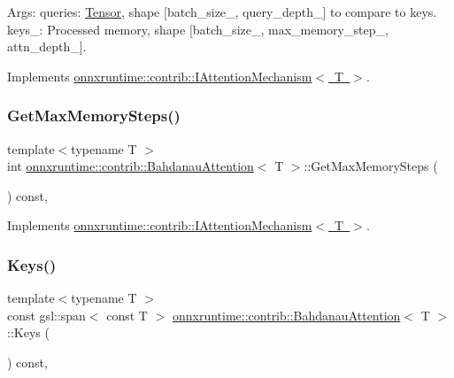 Args\+: queries\+: \mbox{\hyperlink{classonnxruntime_1_1Tensor}{Tensor}}, shape {\ttfamily \mbox{[}batch\+\_\+size\+\_\+, query\+\_\+depth\+\_\+\mbox{]}} to compare to keys. keys\+\_\+\+: Processed memory, shape {\ttfamily \mbox{[}batch\+\_\+size\+\_\+, max\+\_\+memory\+\_\+step\+\_\+, attn\+\_\+depth\+\_\+\mbox{]}}. 

Implements \mbox{\hyperlink{classonnxruntime_1_1contrib_1_1IAttentionMechanism_a06c96353dea91e2e81d22f34a96da713}{onnxruntime\+::contrib\+::\+I\+Attention\+Mechanism$<$ T $>$}}.

\mbox{\label{classonnxruntime_1_1contrib_1_1BahdanauAttention_a97cf203e5f792cd85f1213c744ed63e7}} 
\subsubsection{\texorpdfstring{Get\+Max\+Memory\+Steps()}{GetMaxMemorySteps()}}
{\footnotesize\ttfamily template$<$typename T $>$ \\
int \mbox{\hyperlink{classonnxruntime_1_1contrib_1_1BahdanauAttention}{onnxruntime\+::contrib\+::\+Bahdanau\+Attention}}$<$ T $>$\+::Get\+Max\+Memory\+Steps (\begin{DoxyParamCaption}{ }\end{DoxyParamCaption}) const\hspace{0.3cm}{\ttfamily [override]}, {\ttfamily [virtual]}}



Implements \mbox{\hyperlink{classonnxruntime_1_1contrib_1_1IAttentionMechanism_ab39e568cfd98ecbc8403ae4291ff3ab2}{onnxruntime\+::contrib\+::\+I\+Attention\+Mechanism$<$ T $>$}}.

\mbox{\label{classonnxruntime_1_1contrib_1_1BahdanauAttention_afc0509bb32e8e067ebcb7529d7a9c248}} 
\subsubsection{\texorpdfstring{Keys()}{Keys()}}
{\footnotesize\ttfamily template$<$typename T $>$ \\
const gsl\+::span$<$ const T $>$ \mbox{\hyperlink{classonnxruntime_1_1contrib_1_1BahdanauAttention}{onnxruntime\+::contrib\+::\+Bahdanau\+Attention}}$<$ T $>$\+::Keys (\begin{DoxyParamCaption}{ }\end{DoxyParamCaption}) const\hspace{0.3cm}{\ttfamily [override]}, {\ttfamily [virtual]}}



